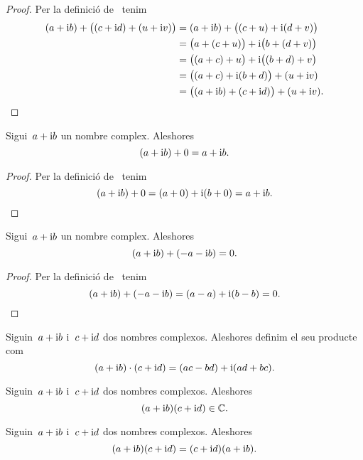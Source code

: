 \documentclass[../Apunts.tex]{subfiles}
\begin{document}
	\begin{proof}
		Per la definició de~ tenim
		\begin{align*}
			(a+\mathrm{i} b)+\big((c+\mathrm{i} d)+(u+\mathrm{i} v)\big)
			&=(a+\mathrm{i} b)+\big((c+u)+\mathrm{i}(d+v)\big) \\
			&=\big(a+(c+u)\big)+\mathrm{i}\big(b+(d+v)\big) \\
			&=\big((a+c)+u\big)+\mathrm{i}\big((b+d)+v\big) \\
			&=\big((a+c)+\mathrm{i}(b+d)\big)+(u+\mathrm{i} v) \\
			&=\big((a+\mathrm{i} b)+(c+\mathrm{i} d)\big)+(u+\mathrm{i} v).\qedhere
		\end{align*}
	\end{proof}
	\begin{proposition}
		\label{prop:element neutre per la suma dels complexos}
		Sigui~\(a+\mathrm{i} b\) un nombre complex.
		Aleshores
		\[(a+\mathrm{i} b)+0=a+\mathrm{i} b.\]
	\end{proposition}
	\begin{proof}
		Per la definició de~ tenim
		\[(a+\mathrm{i} b)+0=(a+0)+\mathrm{i}(b+0)=a+\mathrm{i} b.\qedhere\]
	\end{proof}
	\begin{proposition}
		\label{prop:element invers per la suma dels complexos}
		Sigui~\(a+\mathrm{i} b\) un nombre complex.
		Aleshores
		\[(a+\mathrm{i} b)+(-a-\mathrm{i} b)=0.\]
	\end{proposition}
	\begin{proof}
		Per la definició de~ tenim
		\[(a+\mathrm{i} b)+(-a-\mathrm{i} b)=(a-a)+\mathrm{i}(b-b)=0.\qedhere\]
	\end{proof}
	\begin{definition}
		\label{def:producte de nombres complexos}
		Siguin~\(a+\mathrm{i} b\) i~\(c+\mathrm{i} d\) dos nombres complexos.
		Aleshores definim el seu producte com
		\[(a+\mathrm{i} b)\cdot(c+\mathrm{i} d)=(ac-bd)+\mathrm{i}(ad+bc).\]
	\end{definition}
	\begin{observation}
		\label{obs:els nombres complexos estan tancats pel producte}
		Siguin~\(a+\mathrm{i} b\) i~\(c+\mathrm{i} d\) dos nombres complexos.
		Aleshores
		\[(a+\mathrm{i} b)(c+\mathrm{i} d)\in\mathbb{C}.\]
	\end{observation}
	\begin{proposition}
		\label{prop:els nombres complexos commuten pel producte}
		Siguin~\(a+\mathrm{i} b\) i~\(c+\mathrm{i} d\) dos nombres complexos.
		Aleshores
		\[(a+\mathrm{i} b)(c+\mathrm{i} d)=(c+\mathrm{i} d)(a+\mathrm{i} b).\]
	\end{proposition}
\end{document}

